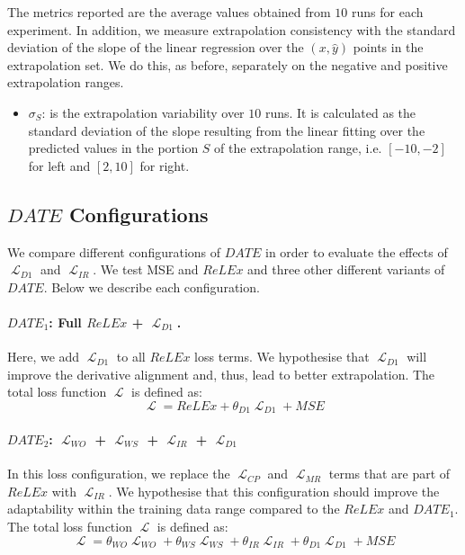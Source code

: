 \documentclass[runningheads]{llncs}
\DeclareMathOperator{\Lagr}{\mathcal{L}}
\begin{document}
The metrics reported are the average values obtained from $10$ runs for each experiment.
In addition, we measure extrapolation consistency with the standard deviation of the slope of the linear regression over the $(x,\hat{y})$ points in the extrapolation set. 
We do this, as before, separately on the negative and positive extrapolation ranges. 

\begin{itemize}
 
 \item \textbf{$\sigma_{S}$}: is the extrapolation variability over $10$ runs. It is calculated as the standard deviation of the slope resulting from the linear fitting over the predicted values in the portion $S$ of the extrapolation range, i.e. $[-10,-2]$ for left and $[2,10]$ for right.
\end{itemize}



\subsection{$DATE$ Configurations}

We compare different configurations of $DATE$ in order to evaluate the effects of $\Lagr_{D1}$ and $\Lagr_{IR}$.
We test MSE and $ReLEx$ and three other different variants of $DATE$. 
Below we describe each configuration.

\paragraph{$DATE_1$: Full $ReLEx$ + $\Lagr_{D1}$. }
Here, we add $\Lagr_{D1}$ to all $ReLEx$ loss terms. 
We hypothesise that $\Lagr_{D1}$ will improve the derivative alignment and, thus, lead to better extrapolation. 
The total loss function $\Lagr$ is defined as:
\begin{equation}
 \Lagr = ReLEx + \theta_{D1}\Lagr_{D1} + MSE
\end{equation} 

\paragraph{$DATE_2$: $\Lagr_{WO}$ + $\Lagr_{WS}$ + $\Lagr_{IR}$ + $\Lagr_{D1}$ }
In this loss configuration, we replace the $\Lagr_{CP}$ and $\Lagr_{MR}$ terms that are part of $ReLEx$ with $\Lagr_{IR}$. 
We hypothesise that this configuration should improve the adaptability within the training data range compared to the $ReLEx$ and $DATE_1$.
The total loss function $\Lagr$ is defined as:
\begin{equation}
 \Lagr = \theta_{WO}\Lagr_{WO} + \theta_{WS}\Lagr_{WS} + \theta_{IR}\Lagr_{IR} + \theta_{D1}\Lagr_{D1} + MSE
\end{equation} 
\end{document}
